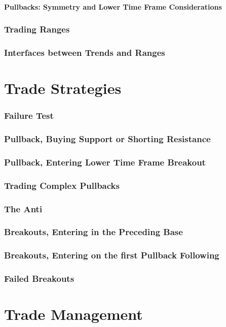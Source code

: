\documentclass{../notes}
\begin{document}
\subsection{Pullbacks: Symmetry and Lower Time Frame Considerations}


\section{Trading Ranges}
\section{Interfaces between Trends and Ranges}

\part{Trade Strategies}
\section{Failure Test}
\section{Pullback, Buying Support or Shorting Resistance}
\section{Pullback, Entering Lower Time Frame Breakout}
\section{Trading Complex Pullbacks}
\section{The Anti}
\section{Breakouts, Entering in the Preceding Base}
\section{Breakouts, Entering on the first Pullback Following}
\section{Failed Breakouts}

\part{Trade Management}
\end{document}
